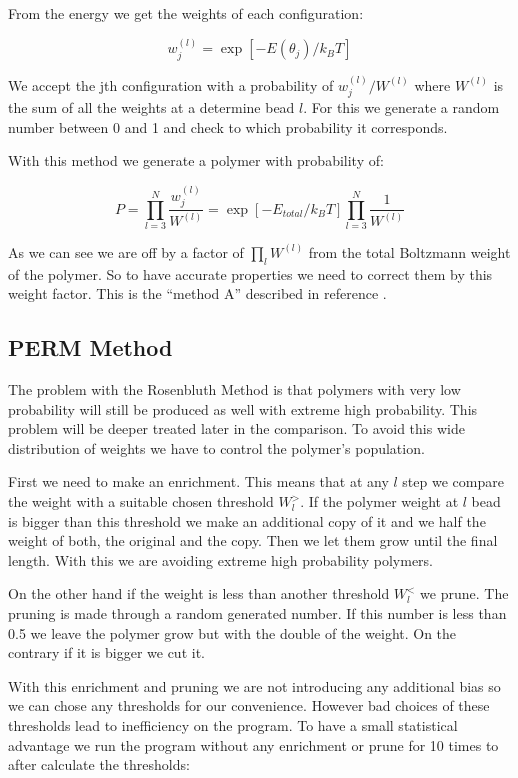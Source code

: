 \documentclass[aps,prl,reprint,groupedaddress]{revtex4-1}
\begin{document}
From the energy we get the weights of each configuration:

\begin{equation}
	w_j^{(l)} = \exp[-E(\theta_j)/k_BT]
\end{equation}

We accept the jth configuration with a probability of $w_j^{(l)}/W^{(l)}$ where $W^{(l)}$ is the sum of all the weights at a determine bead $l$. For this we generate a random number between 0 and 1 and check to which probability it corresponds. 

With this method we generate a polymer with probability of:

\begin{equation}
	P = \prod_{l=3}^N \frac{w_j^{(l)}}{W^{(l)}}= \exp[-E_{total}/k_BT]\prod_{l=3}^N \frac{1}{W^{(l)}}
\end{equation}

As we can see we are off by a factor of $\prod_lW^{(l)}$ from the total Boltzmann weight of the polymer. So to have accurate properties we need to correct them by this weight factor. This is the ``method A'' described in reference \cite{ICCPBook}.

\subsection{PERM Method}
The problem with the Rosenbluth Method is that polymers with very low probability will still be produced as well with extreme high probability. This problem will be deeper treated later in the comparison. To avoid this wide distribution of weights we have to control the polymer's population.

First we need to make an enrichment. This means that at any $l$ step we compare the weight with a suitable chosen threshold $W_l^>$. If the polymer weight at $l$ bead is bigger than this threshold we make an additional copy of it and we half the weight of both, the original and the copy. Then we let them grow until the final length. With this we are avoiding extreme high probability polymers. 

On the other hand if the weight is less than another threshold $W_l^<$ we prune. The pruning is made through a random generated number. If this number is less than 0.5 we leave the polymer grow but with the double of the weight. On the contrary if it is bigger we cut it. 

With this enrichment and pruning we are not introducing any additional bias so we can chose any thresholds for our convenience. However bad choices of these thresholds lead to inefficiency on the program. To have a small statistical advantage we run the program without any enrichment or prune for 10 times to after calculate the thresholds: 
\end{document}

